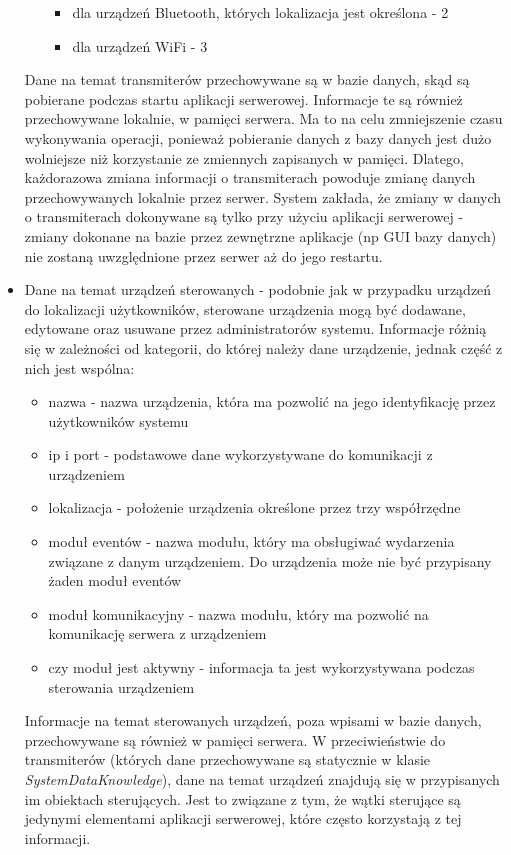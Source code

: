\begin{itemize}
\begin{itemize}
\begin{itemize}
			\item dla urządzeń Bluetooth, których lokalizacja jest określona - 2
			\item dla urządzeń WiFi - 3
		\end{itemize}
	\end{itemize}
	Dane na temat transmiterów przechowywane są w bazie danych, skąd są pobierane podczas startu aplikacji serwerowej. Informacje te są również przechowywane lokalnie, w pamięci serwera. Ma to na celu zmniejszenie czasu wykonywania operacji, ponieważ pobieranie danych z bazy danych jest dużo wolniejsze niż korzystanie ze zmiennych zapisanych w pamięci. Dlatego, każdorazowa zmiana informacji o transmiterach powoduje zmianę danych przechowywanych lokalnie przez serwer. System zakłada, że zmiany w danych o transmiterach dokonywane są tylko przy użyciu aplikacji serwerowej - zmiany dokonane na bazie przez zewnętrzne aplikacje (np GUI bazy danych) nie zostaną uwzględnione przez serwer aż do jego restartu.
	\item Dane na temat urządzeń sterowanych - podobnie jak w przypadku urządzeń do lokalizacji użytkowników, sterowane urządzenia mogą być dodawane, edytowane oraz usuwane przez administratorów systemu. Informacje różnią się w zależności od kategorii, do której należy dane urządzenie, jednak część z nich jest wspólna:
	\begin{itemize}
		\item nazwa - nazwa urządzenia, która ma pozwolić na jego identyfikację przez użytkowników systemu
		\item ip i port - podstawowe dane wykorzystywane do komunikacji z urządzeniem
		\item lokalizacja - położenie urządzenia określone przez trzy współrzędne
		\item moduł eventów - nazwa modułu, który ma obsługiwać wydarzenia związane z danym urządzeniem. Do urządzenia może nie być przypisany żaden moduł eventów
		\item moduł komunikacyjny - nazwa modułu, który ma pozwolić na komunikację serwera z urządzeniem
		\item czy moduł jest aktywny - informacja ta jest wykorzystywana podczas sterowania urządzeniem 
	\end{itemize}
	Informacje na temat sterowanych urządzeń, poza wpisami w bazie danych, przechowywane są również w pamięci serwera. W przeciwieństwie do transmiterów (których dane przechowywane są statycznie w klasie \textit{SystemDataKnowledge}), dane na temat urządzeń znajdują się w przypisanych im obiektach sterujących. Jest to związane z tym, że wątki sterujące są jedynymi elementami aplikacji serwerowej, które często korzystają z tej informacji.\\

\end{itemize}
